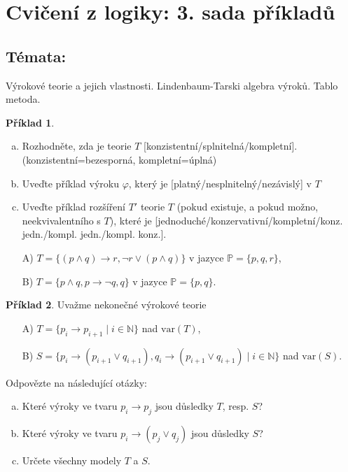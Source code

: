 \documentclass{amsart}
\theoremstyle{definition}
\newtheorem{problem}{Příklad}
\begin{document}
\section*{Cvičení z logiky: 3. sada příkladů}

\bigskip\bigskip\bigskip

\subsection*{Témata:} 

Výrokové teorie a jejich vlastnosti. Lindenbaum-Tarski algebra výroků. Tablo metoda.

\thispagestyle{empty}


\begin{problem}
\begin{enumerate}[(a)]
\item Rozhodněte, zda je teorie $T$ [konzistentní/splnitelná/kompletní]. (konzistentní=bezesporná, kompletní=úplná)
\item Uveďte příklad výroku $\varphi$, který je [platný/nesplnitelný/nezávislý] v $T$
\item Uveďte příklad rozšíření $T'$ teorie $T$ (pokud existuje, a pokud možno, neekvivalentního s $T$), které je [jednoduché/konzervativní/kompletní/konz. jedn./kompl. jedn./kompl. konz.].
\end{enumerate}
\begin{enumerate}
    \item[A)] $T=\{(p\wedge q)\to r, \neg r\vee(p\wedge q)\}$ v jazyce $\mathbb P=\{p,q,r\}$,
    \item[B)] $T=\{p\wedge q,p\to\neg q,q\}$ v jazyce $\mathbb P=\{p,q\}$.
\end{enumerate}
\end{problem}



\begin{problem}
Uvažme nekonečné výrokové teorie 
\begin{enumerate}
\item[A)] $T=\{p_i \to p_{i+1}\mid i\in \mathbb{N}\}$ nad $\mathrm{var}(T)$, 
\item[B)] $S=\{p_i \to (p_{i+1} \vee q_{i+1}), q_i \to (p_{i+1} \vee q_{i+1}) \mid i\in \mathbb{N}\}$ nad $\mathrm{var}(S)$.
\end{enumerate}
Odpovězte na následující otázky:
\begin{enumerate}[(a)]
\item Které výroky ve tvaru  $p_i \to p_j$ jsou důsledky $T$, resp. $S$?
\item Které výroky ve tvaru  $p_i \to (p_j \vee q_j)$ jsou důsledky $S$?
\item Určete všechny modely $T$ a $S$.
\end{enumerate}
\end{problem}
\end{document}
